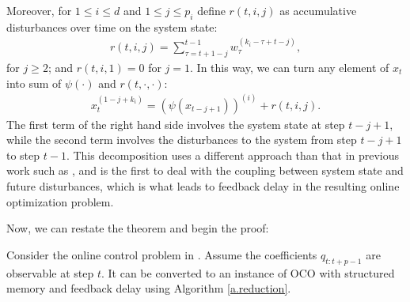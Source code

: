 Moreover, for $1\le i\le d$ and $1\le j\le p_i$ define $r(t,i,j)$ as accumulative disturbances over time on the system state:
\begin{align}
    r(t,i,j)=\sum_{\tau=t+1-j}^{t-1}w_{\tau}^{(k_i-\tau+t-j)},\label{function-r}
\end{align}
for $j\ge2$; and $r(t,i,1)=0$ for $j=1$. In this way, we can turn any element of $x_t$ into sum of $\psi(\cdot)$ and $r(t,\cdot,\cdot)$:
\begin{align}
    x_t^{\left(1-j+k_i\right)}=\left(\psi(x_{t-j+1})\right)^{(i)}+r(t,i,j).\label{t.reduction.aux}
\end{align}
The first term of the right hand side involves the system state at step $t-j+1$, while the second term involves the disturbances to the system from step $t-j+1$ to step $t-1$. This decomposition uses a different approach than that in previous work such as \citep{shi2020online}, and is the first to deal with the coupling between system state and future disturbances, which is what leads to feedback delay in the resulting online optimization problem.



Now, we can restate the theorem and begin the proof:
\begin{theorem*}
Consider the online control problem in . Assume the coefficients $q_{t:t+p-1}$ are observable at step $t$. It can be converted to an instance of OCO with structured memory and feedback delay using Algorithm \ref{a.reduction}. 
\end{theorem*}

